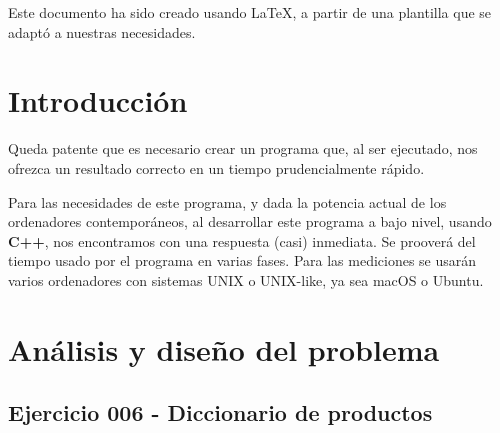 \documentclass[
10pt, %
a4paper, %
oneside, %
headinclude,footinclude, %
BCOR5mm, %
]{scrartcl}
\begin{document}
Este documento ha sido creado usando \LaTeX, a partir de una plantilla que se adaptó a nuestras necesidades. 


\let\thefootnote\relax{}


\newpage %


\section{Introducción}

Queda patente que es necesario crear un programa que, al ser ejecutado, nos ofrezca un resultado correcto en un tiempo prudencialmente rápido.

Para las necesidades de este programa, y dada la potencia actual de los ordenadores contemporáneos, al desarrollar este programa a bajo nivel, usando \textbf{C++}, nos encontramos con una respuesta (casi) inmediata. Se prooverá del tiempo usado por el programa en varias fases. Para las mediciones se usarán varios ordenadores con sistemas UNIX o UNIX-like, ya sea macOS o Ubuntu.
 

\section{Análisis y diseño del problema}

\subsection{Ejercicio 006 - Diccionario de productos}
\end{document}
